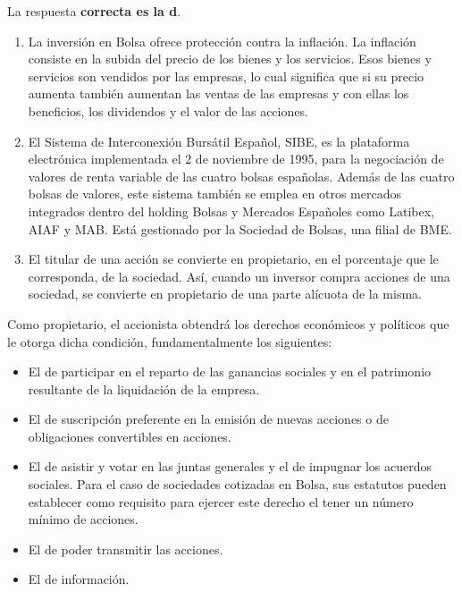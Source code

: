 \documentclass[
  letterpaper,
  DIV=11,
  numbers=noendperiod]{scrreprt}
\begin{document}
\begin{tcolorbox}[enhanced jigsaw, left=2mm, opacityback=0, colback=white, breakable, arc=.35mm, bottomrule=.15mm, rightrule=.15mm, toprule=.15mm, leftrule=.75mm, colframe=quarto-callout-tip-color-frame]
\begin{minipage}[t]{5.5mm}
\textcolor{quarto-callout-tip-color}{\faLightbulb}
\end{minipage}%
\begin{minipage}[t]{\textwidth - 5.5mm}

La respuesta \textbf{correcta es la d}.

\begin{enumerate}
\def\labelenumi{\alph{enumi})}
\item
  La inversión en Bolsa ofrece protección contra la inflación. La
  inflación consiste en la subida del precio de los bienes y los
  servicios. Esos bienes y servicios son vendidos por las empresas, lo
  cual significa que si su precio aumenta también aumentan las ventas de
  las empresas y con ellas los beneficios, los dividendos y el valor de
  las acciones.
\item
  El Sistema de Interconexión Bursátil Español, SIBE, es la plataforma
  electrónica implementada el 2 de noviembre de 1995, para la
  negociación de valores de renta variable de las cuatro bolsas
  españolas. Además de las cuatro bolsas de valores, este sistema
  también se emplea en otros mercados integrados dentro del holding
  Bolsas y Mercados Españoles como Latibex, AIAF y MAB. Está gestionado
  por la Sociedad de Bolsas, una filial de BME.
\item
  El titular de una acción se convierte en propietario, en el porcentaje
  que le corresponda, de la sociedad. Así, cuando un inversor compra
  acciones de una sociedad, se convierte en propietario de una parte
  alícuota de la misma.
\end{enumerate}

Como propietario, el accionista obtendrá los derechos económicos y
políticos que le otorga dicha condición, fundamentalmente los
siguientes:

\begin{itemize}
\item
  El de participar en el reparto de las ganancias sociales y en el
  patrimonio resultante de la liquidación de la empresa.
\item
  El de suscripción preferente en la emisión de nuevas acciones o de
  obligaciones convertibles en acciones.
\item
  El de asistir y votar en las juntas generales y el de impugnar los
  acuerdos sociales. Para el caso de sociedades cotizadas en Bolsa, sus
  estatutos pueden establecer como requisito para ejercer este derecho
  el tener un número mínimo de acciones.
\item
  El de poder transmitir las acciones.
\item
  El de información.
\end{itemize}

\end{minipage}%
\end{tcolorbox}
\end{document}
